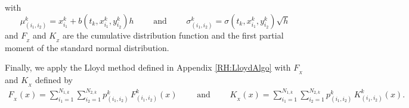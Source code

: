 with
\begin{equation} \label{RH:mean_std_euler}
	\mu_{(i_1,i_2)}^k = x_{i_1}^k + b(t_k, x_{i_1}^k, y_{i_2}^k) h \qquad \textrm{ and } \qquad \sigma_{(i_1,i_2)}^k = \sigma(t_k, x_{i_1}^k, y_{i_2}^k) \sqrt{h}
\end{equation}
and $F_{_Z}$ and $K_{_Z}$ are the cumulative distribution function and the first partial moment of the standard normal distribution.

Finally, we apply the Lloyd method defined in Appendix \eqref{RH:LloydAlgo} with $F_{_X}$ and $K_{_X}$ defined by
\begin{equation}
	\begin{aligned}
		F_{_X} ( x ) = \sum_{i_1=1}^{N_{1,k}} \sum_{i_2=1}^{N_{2,k}} p_{(i_1,i_2)}^k \, F_{(i_1,i_2)}^k ( x ) \qquad \textrm{ and } \qquad K_{_X} ( x ) = \sum_{i_1=1}^{N_{1,k}} \sum_{i_2=1}^{N_{2,k}} p_{(i_1,i_2)}^k \, K_{(i_1,i_2)}^k ( x ).
	\end{aligned}
\end{equation}


